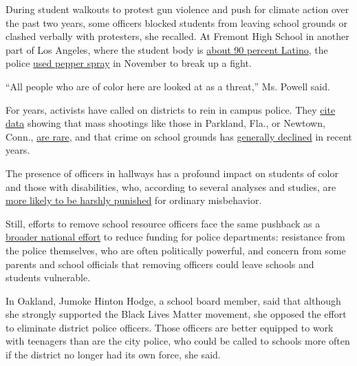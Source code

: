 During student walkouts to protest gun violence and push for climate
action over the past two years, some officers blocked students from
leaving school grounds or clashed verbally with protesters, she
recalled. At Fremont High School in another part of Los Angeles, where
the student body is
\href{https://nces.ed.gov/ccd/schoolsearch/school_detail.asp?Search=1\&DistrictID=0622710\&SchoolPageNum=33\&ID=062271003023}{about
90 percent Latino}, the police
\href{https://www.latimes.com/california/story/2019-11-12/fremont-high-school-fight-lapd-pepper-spray}{used
pepper spray} in November to break up a fight.

``All people who are of color here are looked at as a threat,'' Ms.
Powell said.

For years, activists have called on districts to rein in campus police.
They
\href{http://www.justicepolicy.org/uploads/justicepolicy/documents/educationunderarrest_fullreport.pdf}{cite
data} showing that mass shootings like those in Parkland, Fla., or
Newtown, Conn.,
\href{https://www.nytimes3xbfgragh.onion/2018/05/22/us/safe-school-shootings.html}{are
rare}, and that crime on school grounds has
\href{https://www.nytimes3xbfgragh.onion/2019/04/20/us/columbine-anniversary-school-violence-statistics.html}{generally
declined} in recent years.

The presence of officers in hallways has a profound impact on students
of color and those with disabilities, who, according to several analyses
and studies, are
\href{https://www.edweek.org/ew/projects/2017/policing-americas-schools/student-arrests.html\#/overview}{more
likely to be harshly punished} for ordinary misbehavior.

Still, efforts to remove school resource officers face the same pushback
as a
\href{https://www.nytimes3xbfgragh.onion/2020/06/08/us/unrest-defund-police.html}{broader
national effort} to reduce funding for police departments: resistance
from the police themselves, who are often politically powerful, and
concern from some parents and school officials that removing officers
could leave schools and students vulnerable.

In Oakland, Jumoke Hinton Hodge, a school board member, said that
although she strongly supported the Black Lives Matter movement, she
opposed the effort to eliminate district police officers. Those officers
are better equipped to work with teenagers than are the city police, who
could be called to schools more often if the district no longer had its
own force, she said.

